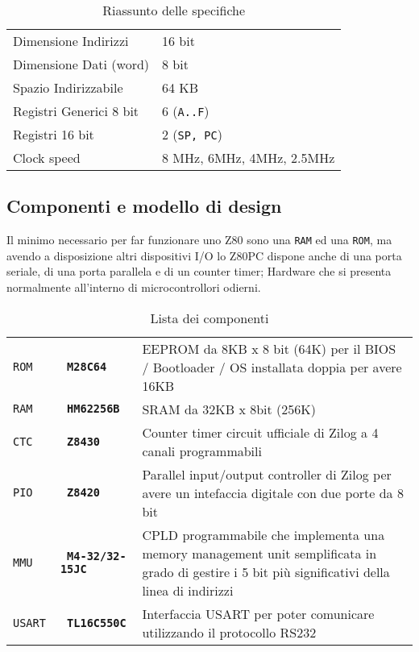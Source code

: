 \documentclass[a4paper, 11pt]{article}
\newcommand{\prj}{Z80\textmu PC\xspace}
\begin{document}
\begin{table}[ht]\centering
\caption{Riassunto delle specifiche}

\begin{tabular}{ l l }
    \toprule
    Dimensione Indirizzi    & 16 bit \\
    Dimensione Dati (word)  & 8 bit \\
    Spazio Indirizzabile    & 64 KB \\
    Registri Generici 8 bit & 6 ({\tt A..F}) \\
    Registri 16 bit         & 2 ({\tt SP, PC}) \\
    Clock speed             & 8 MHz, 6MHz, 4MHz, 2.5MHz \\
    \bottomrule
\end{tabular}
\end{table}

\subsection{Componenti e modello di design}
Il minimo necessario per far funzionare uno Z80 sono una {\tt RAM} ed una
{\tt ROM}, ma avendo a disposizione altri dispositivi I/O lo \prj dispone
anche di una porta seriale, di una porta parallela e di un counter timer;
Hardware che si presenta normalmente all'interno di microcontrollori odierni.

\begin{table}[hb]\centering
\caption{Lista dei componenti}
\begin{tabular}{ >{\tt}p{} >{\tt\bfseries}p{} >{\footnotesize}p{} }
    \toprule
    ROM & M28C64    & EEPROM da 8KB x 8 bit (64K) per il BIOS / Bootloader /
                      OS installata doppia per avere 16KB \\
    RAM & HM62256B  & SRAM da 32KB x 8bit (256K) \\
    CTC & Z8430     & Counter timer circuit ufficiale di Zilog a 4 canali
                      programmabili \\
    PIO & Z8420     & Parallel input/output controller di Zilog per avere un
                      intefaccia digitale con due porte da 8 bit \\
    MMU & M4-32/32-15JC & CPLD programmabile che implementa una memory 
                          management unit semplificata in grado di gestire i 
                          5 bit pi\`u significativi della linea di indirizzi \\
    USART & TL16C550C & Interfaccia USART per poter comunicare utilizzando il
                        protocollo RS232 \\
    \bottomrule
\end{tabular}
\end{table}
\end{document}
